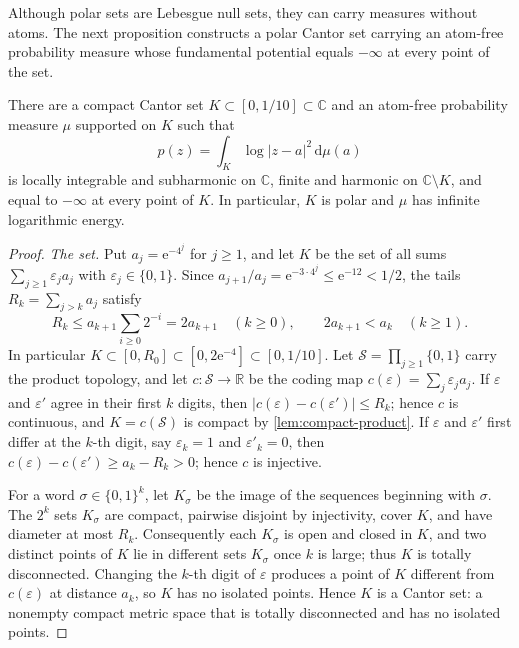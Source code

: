 Although polar sets are Lebesgue null sets, they can carry measures without atoms. The next proposition constructs a polar Cantor set carrying an atom-free probability measure whose fundamental potential equals $-\infty$ at every point of the set.

\begin{proposition}\label{prop:diffuse-polar-cantor-measure}
There are a compact Cantor set $K\subset[0,1/10]\subset\mathbb C$ and an atom-free probability measure $\mu$ supported on $K$ such that
\[
 p(z)=\int_K\log|z-a|^2\,\mathrm d\mu(a)
\]
is locally integrable and subharmonic on $\mathbb C$, finite and harmonic on $\mathbb C\setminus K$, and equal to $-\infty$ at every point of $K$. In particular, $K$ is polar and $\mu$ has infinite logarithmic energy.
\end{proposition}
\begin{proof}
\emph{The set.} Put $a_j=\mathrm e^{-4^j}$ for $j\geq1$, and let $K$ be the set of all sums $\sum_{j\geq1}\varepsilon_ja_j$ with $\varepsilon_j\in\{0,1\}$. Since $a_{j+1}/a_j=\mathrm e^{-3\cdot4^j}\leq\mathrm e^{-12}<1/2$, the tails $R_k=\sum_{j>k}a_j$ satisfy
\[
 R_k\leq a_{k+1}\sum_{i\geq0}2^{-i}=2a_{k+1}\quad(k\geq0),\qquad 2a_{k+1}<a_k\quad(k\geq1).
\]
In particular $K\subset[0,R_0]\subset[0,2\mathrm e^{-4}]\subset[0,1/10]$. Let $\mathcal S=\prod_{j\geq1}\{0,1\}$ carry the product topology, and let $c\colon\mathcal S\to\mathbb R$ be the coding map $c(\varepsilon)=\sum_j\varepsilon_ja_j$. If $\varepsilon$ and $\varepsilon'$ agree in their first $k$ digits, then $|c(\varepsilon)-c(\varepsilon')|\leq R_k$; hence $c$ is continuous, and $K=c(\mathcal S)$ is compact by \cref{lem:compact-product}. If $\varepsilon$ and $\varepsilon'$ first differ at the $k$-th digit, say $\varepsilon_k=1$ and $\varepsilon'_k=0$, then $c(\varepsilon)-c(\varepsilon')\geq a_k-R_k>0$; hence $c$ is injective.

For a word $\sigma\in\{0,1\}^k$, let $K_\sigma$ be the image of the sequences beginning with $\sigma$. The $2^k$ sets $K_\sigma$ are compact, pairwise disjoint by injectivity, cover $K$, and have diameter at most $R_k$. Consequently each $K_\sigma$ is open and closed in $K$, and two distinct points of $K$ lie in different sets $K_\sigma$ once $k$ is large; thus $K$ is totally disconnected. Changing the $k$-th digit of $\varepsilon$ produces a point of $K$ different from $c(\varepsilon)$ at distance $a_k$, so $K$ has no isolated points. Hence $K$ is a Cantor set: a nonempty compact metric space that is totally disconnected and has no isolated points.


\end{proof}

